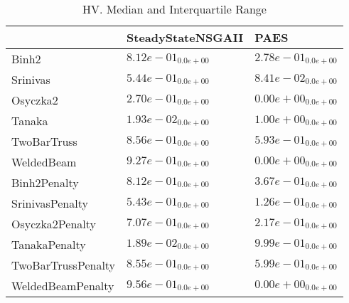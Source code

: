 \documentclass{article}
\begin{document}
\begin{table}
\caption{HV. Median and Interquartile Range}
\label{table: HV}
\centering
\begin{scriptsize}
\begin{tabular}{lll}
\hline & SteadyStateNSGAII &  PAES\\
\hline 
Binh2 & \cellcolor{gray95}$  8.12e-01_{ 0.0e+00}$ & \cellcolor{gray25}$  2.78e-01_{ 0.0e+00}$ \\
Srinivas & \cellcolor{gray95}$  5.44e-01_{ 0.0e+00}$ & \cellcolor{gray25}$  8.41e-02_{ 0.0e+00}$ \\
Osyczka2 & \cellcolor{gray95}$  2.70e-01_{ 0.0e+00}$ & $  0.00e+00_{ 0.0e+00}$ \\
Tanaka & \cellcolor{gray25}$  1.93e-02_{ 0.0e+00}$ & \cellcolor{gray95}$  1.00e+00_{ 0.0e+00}$ \\
TwoBarTruss & \cellcolor{gray95}$  8.56e-01_{ 0.0e+00}$ & \cellcolor{gray25}$  5.93e-01_{ 0.0e+00}$ \\
WeldedBeam & \cellcolor{gray95}$  9.27e-01_{ 0.0e+00}$ & $  0.00e+00_{ 0.0e+00}$ \\
Binh2Penalty & \cellcolor{gray95}$  8.12e-01_{ 0.0e+00}$ & \cellcolor{gray25}$  3.67e-01_{ 0.0e+00}$ \\
SrinivasPenalty & \cellcolor{gray95}$  5.43e-01_{ 0.0e+00}$ & \cellcolor{gray25}$  1.26e-01_{ 0.0e+00}$ \\
Osyczka2Penalty & \cellcolor{gray95}$  7.07e-01_{ 0.0e+00}$ & \cellcolor{gray25}$  2.17e-01_{ 0.0e+00}$ \\
TanakaPenalty & \cellcolor{gray25}$  1.89e-02_{ 0.0e+00}$ & \cellcolor{gray95}$  9.99e-01_{ 0.0e+00}$ \\
TwoBarTrussPenalty & \cellcolor{gray95}$  8.55e-01_{ 0.0e+00}$ & \cellcolor{gray25}$  5.99e-01_{ 0.0e+00}$ \\
WeldedBeamPenalty & \cellcolor{gray95}$  9.56e-01_{ 0.0e+00}$ & $  0.00e+00_{ 0.0e+00}$ \\
\hline
\end{tabular}
\end{scriptsize}
\end{table}
\end{document}
